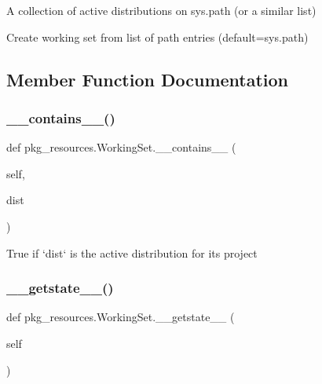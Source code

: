 \begin{DoxyVerb}A collection of active distributions on sys.path (or a similar list)\end{DoxyVerb}
\begin{DoxyVerb}Create working set from list of path entries (default=sys.path)\end{DoxyVerb}
 

\subsection{Member Function Documentation}
\mbox{\label{classpkg__resources_1_1WorkingSet_a6a4880a5d32dac95a7b93f03f7ebc5b9}} 
\subsubsection{\texorpdfstring{\+\_\+\+\_\+contains\+\_\+\+\_\+()}{\_\_contains\_\_()}}
{\footnotesize\ttfamily def pkg\+\_\+resources.\+Working\+Set.\+\_\+\+\_\+contains\+\_\+\+\_\+ (\begin{DoxyParamCaption}\item[{}]{self,  }\item[{}]{dist }\end{DoxyParamCaption})}

\begin{DoxyVerb}True if `dist` is the active distribution for its project\end{DoxyVerb}
 \mbox{\label{classpkg__resources_1_1WorkingSet_a576c93da9ba579531e1c0144dc83769b}} 
\subsubsection{\texorpdfstring{\+\_\+\+\_\+getstate\+\_\+\+\_\+()}{\_\_getstate\_\_()}}
{\footnotesize\ttfamily def pkg\+\_\+resources.\+Working\+Set.\+\_\+\+\_\+getstate\+\_\+\+\_\+ (\begin{DoxyParamCaption}\item[{}]{self }\end{DoxyParamCaption})}

